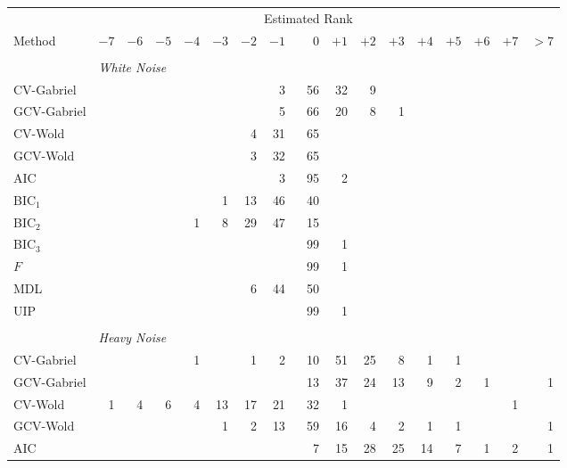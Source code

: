 \begin{table}
    \tiny
    \begin{tabular}{lrrrrrrrrrrrrrrrr}
        \toprule
        &\multicolumn{15}{c}{\scriptsize{Estimated Rank}} \\
        \cmidrule{2-17}
        \scriptsize{Method}
            & $-7$ & $-6$ & $-5$ & $-4$ & $-3$ & $-2$ & $-1$ 
            & $\phantom{+}0$ 
            & $+1$ & $+2$ & $+3$ & $+4$ & $+5$ & $+6$ & $+7$ & $> 7$ \\
        \midrule
        \\
        &\multicolumn{16}{l}{\scriptsize{\textit{White Noise}}} \\
 CV-Gabriel &  &  &  &  &  &  &  3 &  56 &  32 &  9 &  &  &  &  &  & \\ 
 GCV-Gabriel &  &  &  &  &  &  &  5 &  66 &  20 &  8 &  1 &  &  &  &  & \\ 
 CV-Wold &  &  &  &  &  &  4 &  31 &  65 &  &  &  &  &  &  &  & \\ 
 GCV-Wold &  &  &  &  &  &  3 &  32 &  65 &  &  &  &  &  &  &  & \\ 
 AIC &  &  &  &  &  &  &  3 &  95 &  2 &  &  &  &  &  &  & \\ 
 BIC$_1$ &  &  &  &  &  1 &  13 &  46 &  40 &  &  &  &  &  &  &  & \\ 
 BIC$_2$ &  &  &  &  1 &  8 &  29 &  47 &  15 &  &  &  &  &  &  &  & \\ 
 BIC$_3$ &  &  &  &  &  &  &  &  99 &  1 &  &  &  &  &  &  & \\ 
 $F$ &  &  &  &  &  &  &  &  99 &  1 &  &  &  &  &  &  & \\ 
 MDL &  &  &  &  &  &  6 &  44 &  50 &  &  &  &  &  &  &  & \\ 
 UIP &  &  &  &  &  &  &  &  99 &  1 &  &  &  &  &  &  & \\ 
        \\
        &\multicolumn{16}{l}{\scriptsize{\textit{Heavy Noise}}} \\
CV-Gabriel &  &  &  &  1 &  &  1 &  2 &  10 &  51 &  25 &  8 &  1 &  1 &  &  & \\ 
 GCV-Gabriel &  &  &  &  &  &  &  &  13 &  37 &  24 &  13 &  9 &  2 &  1 &  &  1\\ 
 CV-Wold &  1 &  4 &  6 &  4 &  13 &  17 &  21 &  32 &  1 &  &  &  &  &  &  1 & \\ 
 GCV-Wold &  &  &  &  &  1 &  2 &  13 &  59 &  16 &  4 &  2 &  1 &  1 &  &  &  1\\ 
 AIC &  &  &  &  &  &  &  &  7 &  15 &  28 &  25 &  14 &  7 &  1 &  2 &  1\\ 

\end{tabular}
\end{table}
